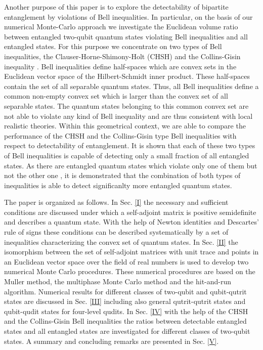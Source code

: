 \documentclass[12pt]{iopart}
\begin{document}
Another purpose of this paper is to explore the detectability of bipartite entanglement by violations of 
Bell inequalities\cite{Pitowsky,Bell}. In particular, on the basis of our numerical Monte-Carlo approach we investigate the Euclidean volume ratio between entangled two-qubit quantum states violating 
Bell inequalities and all entangled states. For this purpose we concentrate on two types of Bell inequalities, the Clauser-Horne-Shimony-Holt (CHSH) \cite{CHSH} 
and the Collins-Gisin inequality \cite{CG}.
 Bell inequalities define half-spaces which are convex sets in the Euclidean vector space of the Hilbert-Schmidt inner product. 
These half-spaces contain the set of all separable quantum states. 
Thus, all Bell inequalities define a common non-empty convex set \cite{Rockafellar} which is larger than the convex set of all separable states. 
The quantum states belonging to this common convex set are not able to violate any kind of Bell inequality and are thus consistent with local realistic theories. Within this geometrical context, we are able to 
compare the performance of the CHSH and the Collins-Gisin type Bell inequalities with respect to detectability of entanglement. It is shown that each of these 
two types of Bell inequalities is capable of detecting only a 
small fraction of all entangled states. As there are entangled quantum states which violate only one of them but not the other one \cite{CG}, it is demonstrated that the combination of both types of 
inequalities is able to detect significanlty more entangled quantum states.

The paper is organized as follows. In Sec. \ref{I} the necessary and sufficient conditions are discussed under which a self-adjoint matrix
is positive semidefinite and describes a quantum state. With the help of Newton identities
and Descartes' rule of signs these conditions can be described systematically by a set of inequalities characterizing the convex set of quantum states. In Sec. \ref{II} the isomorphism between
the set of self-adjoint matrices with unit trace and points in an Euclidean vector space over the field of real numbers is used to develop two numerical Monte Carlo procedures.
These numerical procedures are based on the Muller method, the multiphase Monte Carlo method and the hit-and-run algorithm.
Numerical results for different classes of two-qubit and qubit-qutrit states are discussed in Sec. \ref{III} including also general qutrit-qutrit states and qubit-qudit states for four-level qudits.
In Sec. \ref{IV} with the help of the CHSH and the Collins-Gisin Bell inequalities the ratios between detectable entangled states and all entangled states are investigated for different classes of two-qubit states. A summary and
concluding remarks are presented in Sec. \ref{V}.
\end{document}
